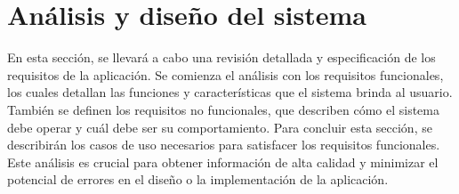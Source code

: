\chapter{Análisis y diseño del sistema}
En esta sección, se llevará a cabo una revisión detallada y especificación de los requisitos de la aplicación. Se comienza el análisis con los requisitos funcionales, los cuales detallan las funciones y características que el sistema brinda al usuario. También se definen los requisitos no funcionales, que describen cómo el sistema debe operar y cuál debe ser su comportamiento. Para concluir esta sección, se describirán los casos de uso necesarios para satisfacer los requisitos funcionales. Este análisis es crucial para obtener información de alta calidad y minimizar el potencial de errores en el diseño o la implementación de la aplicación.




